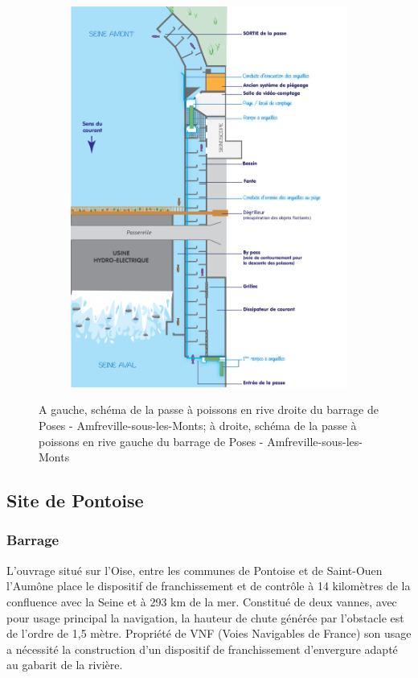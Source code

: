 \documentclass[11pt,titlepage,twoside]{article}\usepackage[]{graphicx}\usepackage[table]{xcolor}
\begin{document}
\begin{figure}[hptb]
\begin{subfigure}[b]{0.448\textwidth}
        \includegraphics[width=\textwidth]{schema_passe_rg_poses}
    \end{subfigure}
       \caption{A gauche, schéma de la passe à poissons en rive droite du barrage de Poses - Amfreville-sous-les-Monts; à droite, schéma de la passe à poissons en rive gauche du barrage de Poses - Amfreville-sous-les-Monts}
       \label{schema_passes}
\end{figure}

\subsection{Site de Pontoise}

\subsubsection{Barrage}

L’ouvrage situé sur l’Oise, entre les communes de Pontoise et de Saint-Ouen l’Aumône place le dispositif de franchissement et de contrôle à 14 kilomètres de la confluence avec la Seine et à 293 km de la mer. Constitué de deux vannes, avec pour usage principal la navigation, la hauteur de chute générée par l’obstacle est de l’ordre de 1,5 mètre. Propriété de VNF (Voies Navigables de France) son usage a nécessité la construction d’un dispositif de franchissement d’envergure adapté au gabarit de la rivière.
\end{document}
